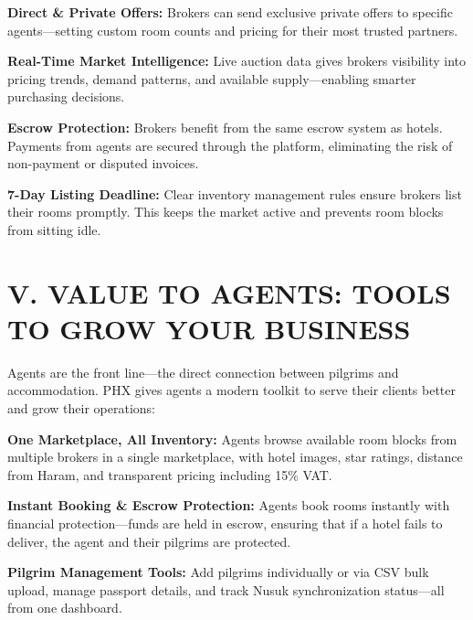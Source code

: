\documentclass[11pt,a4paper]{article}
\begin{document}
\vspace{0.3cm}

\textbf{Direct \& Private Offers:} Brokers can send exclusive private offers to specific agents---setting custom room counts and pricing for their most trusted partners.

\vspace{0.3cm}

\textbf{Real-Time Market Intelligence:} Live auction data gives brokers visibility into pricing trends, demand patterns, and available supply---enabling smarter purchasing decisions.

\vspace{0.3cm}

\textbf{Escrow Protection:} Brokers benefit from the same escrow system as hotels. Payments from agents are secured through the platform, eliminating the risk of non-payment or disputed invoices.

\vspace{0.3cm}

\textbf{7-Day Listing Deadline:} Clear inventory management rules ensure brokers list their rooms promptly. This keeps the market active and prevents room blocks from sitting idle.

\section*{V. VALUE TO AGENTS: TOOLS TO GROW YOUR BUSINESS}

Agents are the front line---the direct connection between pilgrims and accommodation. PHX gives agents a modern toolkit to serve their clients better and grow their operations:

\vspace{0.3cm}

\textbf{One Marketplace, All Inventory:} Agents browse available room blocks from multiple brokers in a single marketplace, with hotel images, star ratings, distance from Haram, and transparent pricing including 15\% VAT.

\vspace{0.3cm}

\textbf{Instant Booking \& Escrow Protection:} Agents book rooms instantly with financial protection---funds are held in escrow, ensuring that if a hotel fails to deliver, the agent and their pilgrims are protected.

\vspace{0.3cm}

\textbf{Pilgrim Management Tools:} Add pilgrims individually or via CSV bulk upload, manage passport details, and track Nusuk synchronization status---all from one dashboard.
\end{document}
